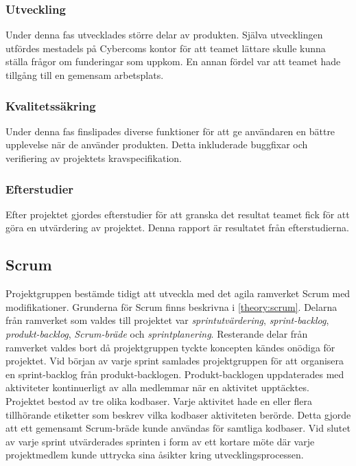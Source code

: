 \subsubsection*{Utveckling}
Under denna fas utvecklades större delar av produkten. Själva utvecklingen utfördes mestadels på Cybercoms kontor för att teamet lättare skulle kunna ställa frågor om funderingar som uppkom. En annan fördel var att teamet hade tillgång till en gemensam arbetsplats.

\subsubsection*{Kvalitetssäkring}
Under denna fas finslipades diverse funktioner för att ge användaren en bättre upplevelse när de använder produkten. Detta inkluderade buggfixar och verifiering av projektets kravspecifikation.

\subsubsection*{Efterstudier}
Efter projektet gjordes efterstudier för att granska det resultat teamet fick för att göra en utvärdering av projektet. Denna rapport är resultatet från efterstudierna.

\subsection{Scrum}
\label{main:Scrum}
Projektgruppen bestämde tidigt att utveckla med det agila ramverket Scrum med modifikationer. Grunderna för Scrum finns beskrivna i \ref{theory:scrum}. Delarna från ramverket som valdes till projektet var \textit{sprintutvärdering}, \textit{sprint-backlog}, \textit{produkt-backlog}, \textit{Scrum-bräde} och \textit{sprintplanering}. Resterande delar från ramverket valdes bort då projektgruppen tyckte koncepten kändes onödiga för projektet. Vid början av varje sprint samlades projektgruppen för att organisera en sprint-backlog från produkt-backlogen. Produkt-backlogen uppdaterades med aktiviteter kontinuerligt av alla medlemmar när en aktivitet upptäcktes. Projektet bestod av tre olika kodbaser. Varje aktivitet hade en eller flera tillhörande etiketter som beskrev vilka kodbaser aktiviteten berörde. Detta gjorde att ett gemensamt Scrum-bräde kunde användas för samtliga kodbaser. Vid slutet av varje sprint utvärderades sprinten i form av ett kortare möte där varje projektmedlem kunde uttrycka sina åsikter kring utvecklingsprocessen.

